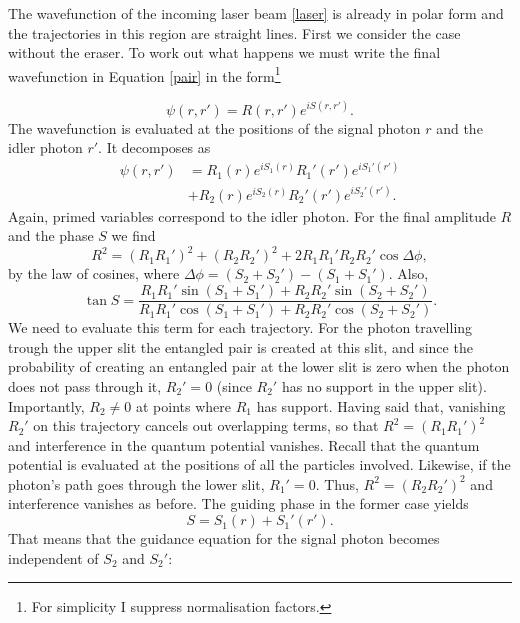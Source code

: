\documentclass[11pt]{article}
\numberwithin{equation}{section}
\begin{document}
The wavefunction of the incoming laser beam \ref{laser} is already in polar form and the trajectories in this region are straight lines. First we consider the case without the eraser. To work out what happens we must write the final wavefunction in Equation \ref{pair} in the form\footnote{For simplicity I suppress normalisation factors.}

\begin{equation}
\psi(r,r')= R(r,r')e^{iS(r,r')}.
\end{equation} The wavefunction is evaluated at the positions of the signal photon $r$ and the idler photon $r'$. It decomposes as 
\begin{align}
\psi(r,r')&=R_1(r)e^{iS_1(r)}
R_1'(r')e^{iS_1'(r')}\nonumber\\
&+R_2(r)e^{iS_2(r)} R_2'(r')e^{iS_2'(r')}.
\end{align} Again, primed variables correspond to the idler photon. For the final amplitude $R$ and the phase $S$ we find
\begin{equation}
R^2 =(R_1R_1')^2 + (R_2R_2')^2 + 2R_1R_1'R_2R_2'\cos\Delta \phi,
\end{equation} by the law of cosines, where $\Delta\phi=(S_2+S_2')-(S_1+S_1')$. Also, 
\begin{equation}
\tan S = \frac{R_1R_1'\sin(S_1+S_1')+R_2R_2'\sin(S_2+S_2')}{R_1R_1'\cos(S_1+S_1')+R_2R_2'\cos(S_2+S_2')}.
\end{equation}
We need to evaluate this term for each trajectory. For the photon travelling trough the upper slit the entangled pair is created at this slit, and since the probability of creating an entangled pair at the lower slit is zero when the photon does not pass through it, $R_2'=0$ (since $R_2'$ has no support in the upper slit). Importantly, $R_2\neq 0$ at points where $R_1$ has support. Having said that, vanishing $R_2'$ on this trajectory cancels out overlapping terms, so that $R^2=(R_1R_1')^2$ and interference in the quantum potential vanishes. Recall that the quantum potential is evaluated at the positions of all the particles involved. Likewise, if the photon's path goes through the lower slit, $R_1'=0$. Thus, $R^2=(R_2R_2')^2$ and interference vanishes as before. The guiding phase in the former case yields
\begin{equation}
S= S_1(r)+S_1'(r').
\end{equation} That means that the guidance equation for the signal photon becomes independent of $S_2$ and $S_2'$:
\end{document}
